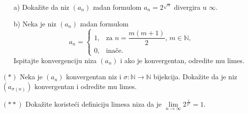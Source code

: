 \begin{exercise} \textbf{}
\begin{itemize}
\item[a)] Dokažite da niz $(a_n)$ zadan formulom $a_n=2^{\sqrt{n}}$ divergira u $\infty$.
\item[b)] Neka je niz $(a_n)$ zadan formulom
$$a_n=\begin{cases}
1, & \text{za } n=\dfrac{m(m+1)}{2},\, m\in \mathbb{N},\\
0, & \text{inače}.
\end{cases}$$
Ispitajte konvergenciju niza $(a_n)$ i ako je konvergentan, odredite mu limes.
\end{itemize}
\end{exercise}
\begin{exercise} $(*)$
Neka je $(a_n)$ konvergentan niz i $\sigma : \mathbb{N}\to \mathbb{N}$ bijekcija. Dokažite da je niz $(a_{\sigma(n)})$ konvergentan i odredite mu limes.
\end{exercise}
\begin{exercise} $(**)$
Dokažite koristeći definiciju limesa niza da je $\lim\limits_{n\to \infty}{2^{\frac{1}{2^n}}}=1$.
\end{exercise}
